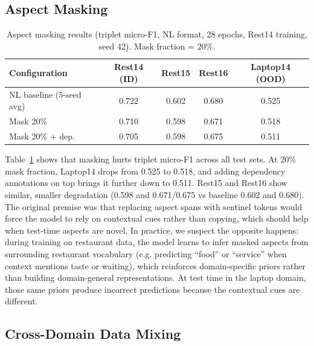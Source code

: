 \documentclass[12pt,a4paper]{report}
\begin{document}
\subsection{Aspect Masking}\label{sec:masking}

\begin{table}[H]
\centering
\caption{Aspect masking results (triplet micro-F1, NL format, 28 epochs, Rest14 training, seed 42). Mask fraction = 20\%.}
\label{tab:masking}
\small
\begin{tabular}{@{}lcccc@{}}
\toprule
\textbf{Configuration} & \textbf{Rest14 (ID)} & \textbf{Rest15} & \textbf{Rest16} & \textbf{Laptop14 (OOD)} \\
\midrule
NL baseline (5-seed avg) & 0.722 & 0.602 & 0.680 & 0.525 \\
\midrule
Mask 20\% & 0.710 & 0.598 & 0.671 & 0.518 \\
Mask 20\% + dep. & 0.705 & 0.598 & 0.675 & 0.511 \\
\bottomrule
\end{tabular}
\end{table}

Table~\ref{tab:masking} shows that masking hurts triplet micro-F1 across all test sets. At 20\% mask fraction, Laptop14 drops from 0.525 to 0.518, and adding dependency annotations on top brings it further down to 0.511. Rest15 and Rest16 show similar, smaller degradation (0.598 and 0.671/0.675 vs baseline 0.602 and 0.680). The original premise was that replacing aspect spans with sentinel tokens would force the model to rely on contextual cues rather than copying, which should help when test-time aspects are novel. In practice, we suspect the opposite happens: during training on restaurant data, the model learns to infer masked aspects from surrounding restaurant vocabulary (e.g. predicting ``food'' or ``service'' when context mentions taste or waiting), which reinforces domain-specific priors rather than building domain-general representations. At test time in the laptop domain, those same priors produce incorrect predictions because the contextual cues are different.

\subsection{Cross-Domain Data Mixing}\label{sec:domainmix}
\end{document}
